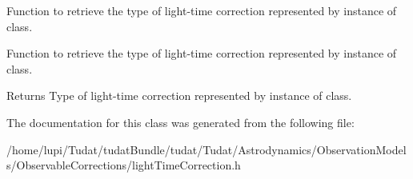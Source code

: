 Function to retrieve the type of light-\/time correction represented by instance of class. 

Function to retrieve the type of light-\/time correction represented by instance of class. \begin{DoxyReturn}{Returns}
Type of light-\/time correction represented by instance of class. 
\end{DoxyReturn}


The documentation for this class was generated from the following file\+:\begin{DoxyCompactItemize}
\item 
/home/lupi/\+Tudat/tudat\+Bundle/tudat/\+Tudat/\+Astrodynamics/\+Observation\+Models/\+Observable\+Corrections/light\+Time\+Correction.\+h\end{DoxyCompactItemize}
